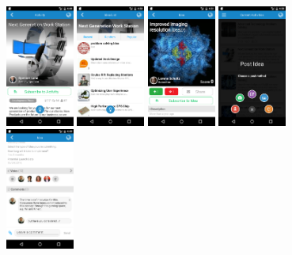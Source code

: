 \begin{figure}[!h]
	\begin{center}
		\includegraphics[width=0.2\textwidth]{./img/competencia/brightIdea/1.png}
		\includegraphics[width=0.2\textwidth]{./img/competencia/brightIdea/2.png}
		\includegraphics[width=0.2\textwidth]{./img/competencia/brightIdea/3.png}
		\includegraphics[width=0.2\textwidth]{./img/competencia/brightIdea/4.png}
		\includegraphics[width=0.2\textwidth]{./img/competencia/brightIdea/5.png}

\end{center}
\end{figure}
